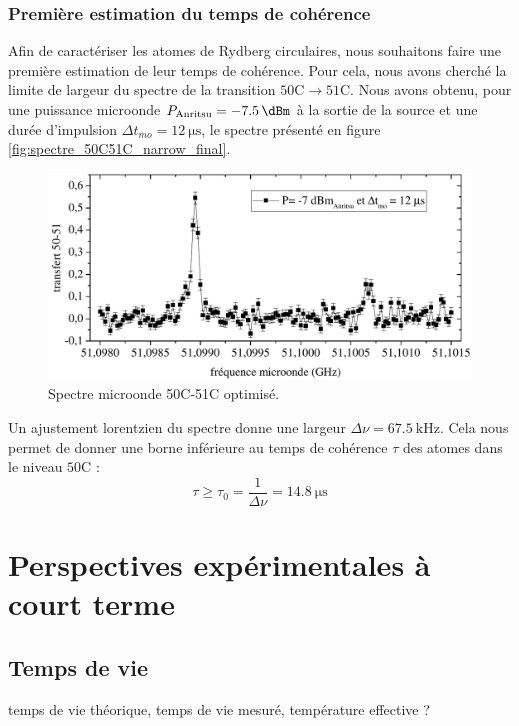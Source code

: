 \subsubsection*{Première estimation du temps de cohérence}
\noindent Afin de caractériser les atomes de Rydberg circulaires, nous souhaitons faire une première estimation de leur temps de cohérence.
Pour cela, nous avons cherché la limite de largeur du spectre de la transition $\mathrm{50C\rightarrow 51C}$.
Nous avons obtenu, pour une puissance microonde $P_{\text{Anritsu}} = \SI{-7.5}{\dBm}$ à la sortie de la source et une durée d'impulsion $\Delta t _{mo} = \SI{12}{\us}$, le spectre présenté en figure \eqref{fig:spectre_50C51C_narrow_final}.
%
\begin{figure}[h]
\centering
\includegraphics[width=.85\linewidth]{figures/circulars/spectre_50C51C_narrow_final}
\caption[Spectre microonde 50C-51C optimisé]{
Spectre microonde 50C-51C optimisé.
}
\label{fig:spectre_50C51C_narrow_final}
\end{figure}
%		
Un ajustement lorentzien du spectre donne une largeur $\Delta\nu = \SI{67.5}{\kHz}$.
Cela nous permet de donner une borne inférieure au temps de cohérence $\tau$ des atomes dans le niveau $\mathrm{50C}$ :
\begin{equation}
\tau \geq \tau_0 = \frac{1}{\Delta\nu} = \SI{14.8}{\us}
\end{equation}

\newpage
\section{Perspectives expérimentales à court terme}
	\subsection{Temps de vie}
		\noindent temps de vie théorique, temps de vie mesuré, température effective ?
